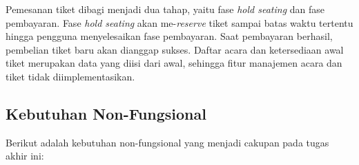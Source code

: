 \endgroup

Pemesanan tiket dibagi menjadi dua tahap, yaitu fase \textit{hold seating} dan fase pembayaran. Fase \textit{hold seating} akan me-\textit{reserve} tiket sampai batas waktu tertentu hingga pengguna menyelesaikan fase pembayaran. Saat pembayaran berhasil, pembelian tiket baru akan dianggap sukses. Daftar acara dan ketersediaan awal tiket merupakan data yang diisi dari awal, sehingga fitur manajemen acara dan tiket tidak diimplementasikan.

\subsection{Kebutuhan Non-Fungsional}

Berikut adalah kebutuhan non-fungsional yang menjadi cakupan pada tugas akhir ini:

